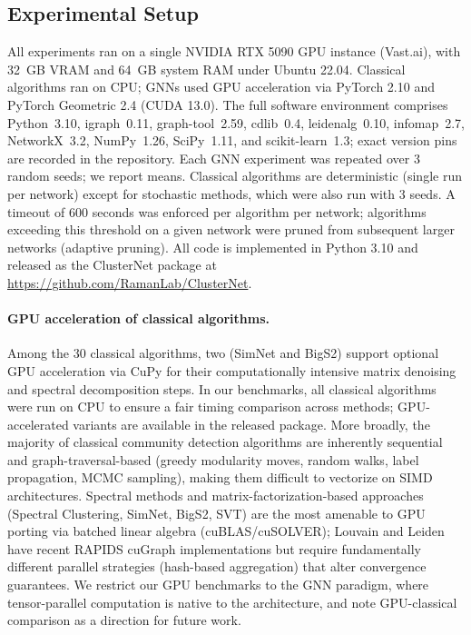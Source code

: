 \documentclass[11pt]{article}
\begin{document}
\subsection{Experimental Setup}
\label{sec:setup}

All experiments ran on a single NVIDIA RTX 5090 GPU instance (Vast.ai), with 32~GB VRAM and 64~GB system RAM under Ubuntu 22.04.
Classical algorithms ran on CPU; GNNs used GPU acceleration via PyTorch 2.10 and PyTorch Geometric 2.4 (CUDA 13.0).
The full software environment comprises Python~3.10, igraph~0.11, graph-tool~2.59, cdlib~0.4, leidenalg~0.10, infomap~2.7, NetworkX~3.2, NumPy~1.26, SciPy~1.11, and scikit-learn~1.3; exact version pins are recorded in the repository.
Each GNN experiment was repeated over 3 random seeds; we report means.
Classical algorithms are deterministic (single run per network) except for stochastic methods, which were also run with 3 seeds.
A timeout of 600 seconds was enforced per algorithm per network; algorithms exceeding this threshold on a given network were pruned from subsequent larger networks (adaptive pruning).
All code is implemented in Python 3.10 and released as the ClusterNet package at \url{https://github.com/RamanLab/ClusterNet}.

\paragraph{GPU acceleration of classical algorithms.}
Among the 30 classical algorithms, two (SimNet and BigS2) support optional GPU acceleration via CuPy for their computationally intensive matrix denoising and spectral decomposition steps.
In our benchmarks, all classical algorithms were run on CPU to ensure a fair timing comparison across methods; GPU-accelerated variants are available in the released package.
More broadly, the majority of classical community detection algorithms are inherently sequential and graph-traversal-based (greedy modularity moves, random walks, label propagation, MCMC sampling), making them difficult to vectorize on SIMD architectures.
Spectral methods and matrix-factorization-based approaches (Spectral Clustering, SimNet, BigS2, SVT) are the most amenable to GPU porting via batched linear algebra (cuBLAS/cuSOLVER); Louvain and Leiden have recent RAPIDS cuGraph implementations but require fundamentally different parallel strategies (hash-based aggregation) that alter convergence guarantees.
We restrict our GPU benchmarks to the GNN paradigm, where tensor-parallel computation is native to the architecture, and note GPU-classical comparison as a direction for future work.
\end{document}
